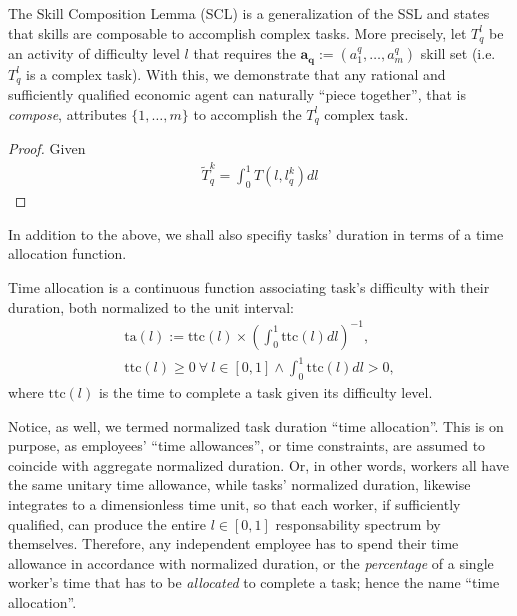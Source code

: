 \documentclass[hidelinks, nonatbib]{elsarticle}
\begin{document}
\begin{lemma}
    \label{scl}
    The Skill Composition Lemma (SCL) is a generalization of the SSL and states that skills are composable to accomplish complex tasks. More precisely, let $T_{q}^{l}$ be an activity of difficulty level $l$ that requires the $\boldsymbol{a_q} := (a_{1}^{q}, \dots, a_{m}^{q})$ skill set (i.e. $T_{q}^{l}$ is a complex task). With this, we demonstrate that any rational and sufficiently qualified economic agent can naturally ``piece together'', that is \textit{compose}, attributes $\{1, \dots, m\}$ to accomplish the $T_{q}^{l}$ complex task.
    
    \begin{proof}
        Given 
        \begin{gather}
            \tilde{T}_{q}^{k} = 
            \int_{0}^{1}{
                T(l, l_{q}^{k})
                dl
            }
        \end{gather}
    \end{proof}
\end{lemma}
In addition to the above, we shall also specifiy tasks' duration in terms of a time allocation function.
\begin{definition}
    \label{ta}
    Time allocation is a continuous function associating task's difficulty with their duration, both normalized to the unit interval:
    \begin{gather}
        \text{ta}(l)
        :=
        \text{ttc}(l)
        \times
        \left(
            \int_{0}^{1}
            \text{ttc}(l)
            dl
        \right) ^ {-1}
        ,
        \\
        \text{ttc}(l)
        \geq
        0
        \
        \forall
        \
        l \in [0,1]
        \land
        \int_{0}^{1}
            \text{ttc}(l)
            dl
            >
            0
        ,
    \end{gather}
    where $\text{ttc}(l)$ is the time to complete a task given its difficulty level.
    
    Notice, as well, we termed normalized task duration ``time allocation''. This is on purpose, as employees' ``time allowances'', or time constraints, are assumed to coincide with aggregate normalized duration. Or, in other words, workers all have the same unitary time allowance, while tasks' normalized duration, likewise integrates to a dimensionless time unit, so that each worker, if sufficiently qualified, can produce the entire $l \in [0,1]$ responsability spectrum by themselves. Therefore, any independent employee has to spend their time allowance in accordance with normalized duration, or the \textit{percentage} of a single worker's time that has to be \textit{allocated} to complete a task; hence the name ``time allocation''.
\end{definition} 
\end{document}
